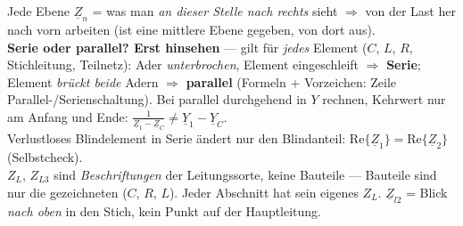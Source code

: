 \begin{rezepttab}
{\begin{minipage}[t]{0.505\linewidth}
    \end{minipage}\hfill
    \begin{minipage}[t]{0.475\linewidth}
    \vspace{0pt}\raggedright
    Jede Ebene $\underline Z_n$ = was man \emph{an dieser Stelle nach rechts}
    sieht $\Rightarrow$ von der Last her nach vorn arbeiten (ist eine mittlere
    Ebene gegeben, von dort aus).\\[0.2em]
    \scriptsize \textbf{Serie oder parallel? Erst hinsehen} — gilt für
    \emph{jedes} Element ($C$, $L$, $R$, Stichleitung, Teilnetz):
    Ader \emph{unterbrochen}, Element eingeschleift $\Rightarrow$
    \textbf{Serie}; Element \emph{brückt beide} Adern $\Rightarrow$
    \textbf{parallel} (Formeln + Vorzeichen: Zeile
    \glqq Parallel-/Serienschaltung\grqq). Bei parallel durchgehend in $Y$
    rechnen, Kehrwert nur am Anfang und Ende:
    $\tfrac{1}{\underline Z_1-\underline Z_C}\neq\underline Y_1-\underline
    Y_C$.\\[0.2em]
    Verlustloses Blindelement in Serie ändert nur den Blindanteil:
    $\mathrm{Re}\{\underline Z_1\}=\mathrm{Re}\{\underline Z_2\}$
    (Selbstcheck).\\[0.2em]
    $Z_L$, $Z_{L3}$ sind \emph{Beschriftungen} der Leitungssorte, keine
    Bauteile — Bauteile sind nur die gezeichneten ($C$, $R$, $L$). Jeder
    Abschnitt hat sein eigenes $Z_L$. $\underline Z_{l2}$ = Blick \emph{nach
    oben} in den Stich, kein Punkt auf der Hauptleitung.
    \end{minipage}} \\ \rzhl

\end{rezepttab}
